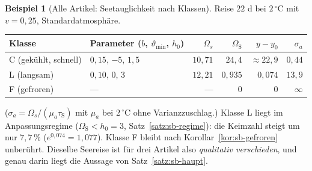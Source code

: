 \documentclass[a4paper, 12pt, twoside, openright]{report}
\theoremstyle{definition}
\theoremstyle{definition}
\newtheorem{beispiel}{Beispiel}[chapter]
\begin{document}
\begin{beispiel}[Alle Artikel: Seetauglichkeit nach Klassen]\label{bsp:sb-klassen}
Reise $22$ d bei $2\,{}^\circ$C mit $v=0{,}25$, Standardatmosphäre.
\begin{center}
\begin{tabular}{llrrrr}
\toprule
Klasse & Parameter ($b$, $\vartheta_{\min}$, $h_0$) & $\Omega_s$ & $\Omega_{\mathrm S}$ & $y-y_0$ & $\sigma_a$\\
\midrule
C (gekühlt, schnell)  & $0{,}15$, $-5$, $1{,}5$ & $10{,}71$ & $24{,}4$ & $\approx 22{,}9$ & $0{,}44$\\
L (langsam)           & $0{,}10$, $0$, $3$      & $12{,}21$ & $0{,}935$ & $0{,}074$ & $13{,}9$\\
F (gefroren)          & ---                      & ---       & $0$ & $0$ & $\infty$\\
\bottomrule
\end{tabular}
\end{center}
($\sigma_a=\Omega_s/(\mu_a\tau_{\mathrm S})$ mit $\mu_a$ bei $2\,{}^\circ$C ohne Varianzzuschlag.)
Klasse L liegt im Anpassungsregime ($\Omega_{\mathrm S}<h_0=3$, Satz~\ref{satz:sb-regime}):
die Keimzahl steigt um nur $7{,}7\,\%$ ($e^{0{,}074}=1{,}077$). Klasse F bleibt nach
Korollar~\ref{kor:sb-gefroren} unberührt. Dieselbe Seereise ist für drei Artikel also
\emph{qualitativ verschieden}, und genau darin liegt die Aussage von Satz~\ref{satz:sb-haupt}.
\end{beispiel}
\end{document}
